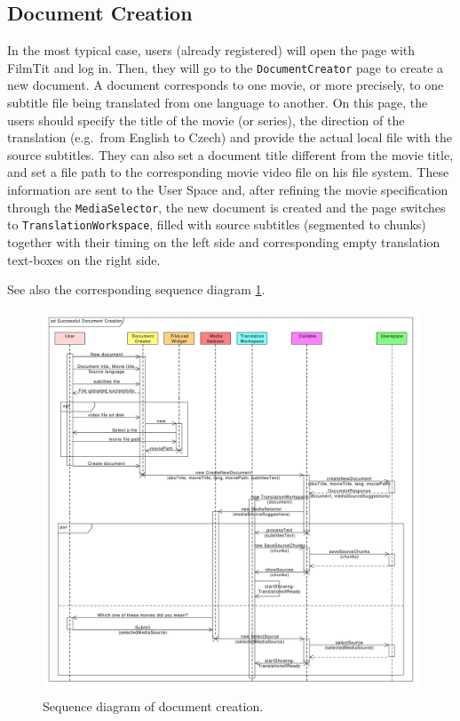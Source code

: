 \subsection{Document Creation}

In the most typical case, users (already registered) will open the page with FilmTit and log in. Then, they will go to the {\tt DocumentCreator} page to create a new document. A document corresponds to one movie, or more precisely, to one subtitle file being translated from one language to another. On this page, the users should specify the title of the movie (or series), the direction of the translation (e.g.\ from English to Czech) and provide the actual local file with the source subtitles. They can also set a document title different from the movie title, and set a file path to the corresponding movie video file on his file system.
These information are sent to the User Space and, after refining the movie specification through the {\tt MediaSelector}, the new document is created and the page switches to {\tt TranslationWorkspace}, filled with source subtitles (segmented to chunks) together with their timing on the left side and corresponding empty translation text-boxes on the right side.

See also the corresponding sequence diagram \ref{gui:sd:document_creation}.

\begin{figure}[h]
\begin{center}
\includegraphics[scale=0.40]{figures/document_creation_sequence_GUI.pdf}
\end{center}
\caption{Sequence diagram of document creation.}\label{gui:sd:document_creation}
\end{figure}

